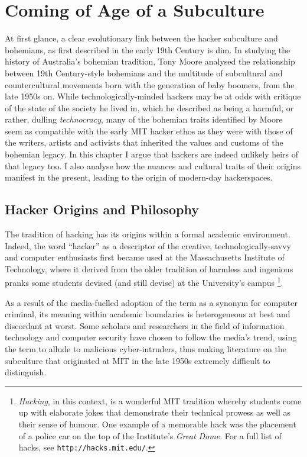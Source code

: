 

\section{Coming of Age of a Subculture}



At first glance, a clear evolutionary link between the hacker subculture and bohemians, as first described in the early 19th Century is dim. In studying the history of Australia's bohemian tradition, Tony Moore \citeyearpar{moore07} analysed the relationship between 19th Century-style bohemians and the multitude of subcultural and countercultural movements born with the generation of baby boomers, from the late 1950s on. While technologically-minded hackers may be at odds with  critique of the state of the society he lived in, which he described as being a harmful, or rather, dulling \textit{technocracy}, many of the bohemian traits identified by Moore seem as compatible with the early MIT hacker ethos as they were with those of the writers, artists and activists that inherited the values and customs of the bohemian legacy. In this chapter I argue that hackers are indeed unlikely heirs of that legacy too. I also analyse how the nuances and cultural traits of their origins manifest in the present, leading to the origin of modern-day hackerspaces.

\label{history}
\subsection{Hacker Origins and Philosophy}

The tradition of hacking has its origins within a formal academic environment. Indeed, the word ``hacker'' as a descriptor of the creative, technologi\-cal\-ly-savvy and computer enthusiasts first became used at the Mas\-sa\-chu\-setts Institute of Technology, where it derived from the older tradition of harmless and ingenious pranks some students devised (and still devise) at the University's campus \citep{levy84}\footnote{\textit{Hacking}, in this context, is a wonderful MIT tradition whereby students come up with elaborate jokes that demonstrate their technical prowess as well as their sense of humour. One example of a memorable hack was the placement of a police car on the top of the Institute's \textit{Great Dome}. For a full list of hacks, see \texttt{http://hacks.mit.edu/}.}.

As a result of the media-fuelled adoption of the term as a synonym for computer criminal, its meaning within academic boundaries is heterogeneous at best and discordant at worst. Some scholars and researchers in the field of information technology and computer security have chosen to follow the media's trend, using the term to allude to malicious cyber-intruders, thus making literature on the subculture that originated at MIT in the late 1950s extremely difficult to distinguish.

